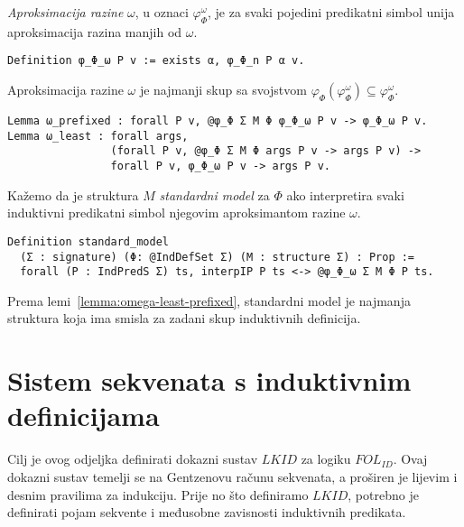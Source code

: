 \begin{definition}
  \textit{Aproksimacija razine} \(\omega\), u oznaci \(\varphi_{\Phi}^{\omega}\), je za svaki pojedini predikatni simbol
  unija aproksimacija razina manjih od \(\omega\).
\begin{verbatim}
Definition φ_Φ_ω P v := exists α, φ_Φ_n P α v.
\end{verbatim}
\end{definition}

\begin{lemma}\label{lemma:omega-least-prefixed}
  Aproksimacija razine \(\omega\) je najmanji skup sa svojstvom \(\varphi_{\Phi}(\varphi_{\Phi}^{\omega}) \subseteq \varphi_{\Phi}^{\omega}\).
\begin{verbatim}
Lemma ω_prefixed : forall P v, @φ_Φ Σ M Φ φ_Φ_ω P v -> φ_Φ_ω P v.
Lemma ω_least : forall args,
                (forall P v, @φ_Φ Σ M Φ args P v -> args P v) ->
                forall P v, φ_Φ_ω P v -> args P v.
\end{verbatim}
\end{lemma}

\begin{definition}
  Kažemo da je struktura \(M\) \textit{standardni model} za \(\Phi\) ako
  interpretira svaki induktivni predikatni simbol njegovim aproksimantom razine \(\omega\).
\begin{verbatim}
Definition standard_model
  (Σ : signature) (Φ: @IndDefSet Σ) (M : structure Σ) : Prop :=
  forall (P : IndPredS Σ) ts, interpIP P ts <-> @φ_Φ_ω Σ M Φ P ts.
\end{verbatim}
\end{definition}
\noindent Prema lemi~\ref{lemma:omega-least-prefixed}, standardni model je
najmanja struktura koja ima smisla za zadani skup induktivnih definicija.


\section{Sistem sekvenata s induktivnim definicijama}\label{sec:sistem-sekvenata}
Cilj je ovog odjeljka definirati dokazni sustav \(\mathit{LKID}\) za logiku \(\mathit{FOL_{ID}}\).
Ovaj dokazni sustav temelji se na Gentzenovu računu sekvenata, a proširen je lijevim i desnim pravilima za indukciju.
Prije no što definiramo \(\mathit{LKID}\), potrebno je definirati pojam sekvente i međusobne zavisnosti induktivnih predikata.

